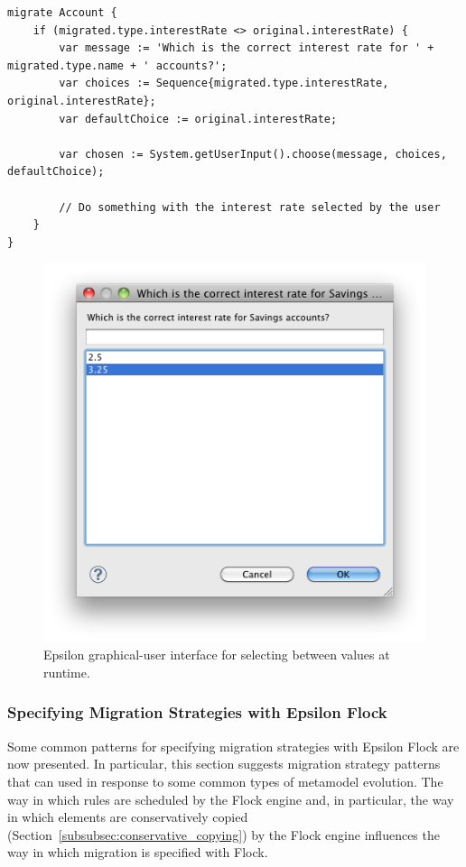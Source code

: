 \begin{lstlisting}[caption=Prompting for user input at runtime, label=lst:user_input, language=Flock, float=tb]
migrate Account {
	if (migrated.type.interestRate <> original.interestRate) {
		var message := 'Which is the correct interest rate for ' + migrated.type.name + ' accounts?';
		var choices := Sequence{migrated.type.interestRate, original.interestRate};
		var defaultChoice := original.interestRate;
		
		var chosen := System.getUserInput().choose(message, choices, defaultChoice);
	
		// Do something with the interest rate selected by the user
	}
}
\end{lstlisting}

\begin{figure}[tbp]
	\centering
		\includegraphics[scale=0.5]{5.Implementation/images/user_input.png}
	\caption{Epsilon graphical-user interface for selecting between values at runtime.}
	\label{fig:user_input}
\end{figure}


\subsubsection{Specifying Migration Strategies with Epsilon Flock}
Some common patterns for specifying migration strategies with Epsilon Flock are now presented. In particular, this section suggests migration strategy patterns that can used in response to some common types of metamodel evolution. The way in which rules are scheduled by the Flock engine and, in particular, the way in which elements are conservatively copied (Section~\ref{subsubsec:conservative_copying}) by the Flock engine influences the way in which migration is specified with Flock.

